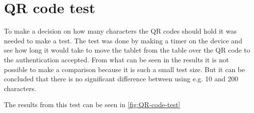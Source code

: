 \section{QR code test}
To make a decision on how many characters the QR codes should hold it was needed to make a test. The test was done by making a timer on the device and see how long it would take to move the tablet from the table over the QR code to the authentication accepted. 
From what can be seen in the results it is not possible to make a comparison because it is such a small test size. But it can be concluded that there is no significant difference between using e.g. 10 and 200 characters.

The results from this test can be seen in \autoref{fig:QR-code-test}

